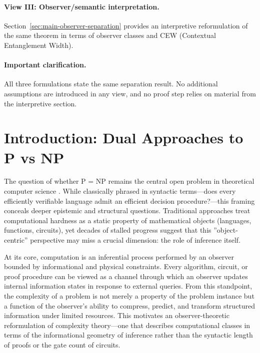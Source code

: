 \documentclass[12pt]{article}
\theoremstyle{definition}
\theoremstyle{definition}
\theoremstyle{remark}
\theoremstyle{remark}
\begin{document}
\paragraph{View III: Observer/semantic interpretation.}
Section~\ref{sec:main-observer-separation} provides an interpretive reformulation
of the same theorem in terms of observer classes and CEW (Contextual Entanglement Width).

\paragraph{Important clarification.}
All three formulations state the same separation result. No additional
assumptions are introduced in any view, and no proof step relies on material
from the interpretive section.

\section{Introduction: Dual Approaches to P vs NP}
\label{sec:intro}


The question of whether P = NP remains the central open problem in theoretical computer science \cite{garey1979,fortnow2009}. While classically phrased in syntactic terms---does every efficiently verifiable language admit an efficient decision procedure?---this framing conceals deeper epistemic and structural questions. Traditional approaches treat computational hardness as a static property of mathematical objects (languages, functions, circuits), yet decades of stalled progress suggest that this ''object-centric'' perspective may miss a crucial dimension: the role of inference itself.

At its core, computation is an inferential process performed by an observer bounded by informational and physical constraints. Every algorithm, circuit, or proof procedure can be viewed as a channel through which an observer updates internal information states in response to external queries. From this standpoint, the complexity of a problem is not merely a property of the problem instance but a function of the observer's ability to compress, predict, and transform structured information under limited resources. This motivates an observer-theoretic reformulation of complexity theory---one that describes computational classes in terms of the informational geometry of inference rather than the syntactic length of proofs or the gate count of circuits.
\end{document}
